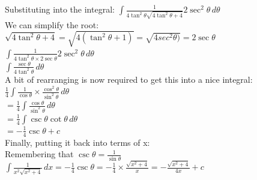 \documentclass[../main.tex]{subfiles}
\begin{document}
    Substituting into the integral:
    \(\int \frac{1}{4\tan^2{\theta}\sqrt{4\tan^2{\theta}+4}}2\sec^2{\theta}\,d\theta\)\\

    We can simplify the root:\\
    \(\sqrt{4\tan^2{\theta}+4}=\sqrt{4(\tan^2{\theta}+1)}=\sqrt{4sec^2{\theta)}}=2\sec{\theta}\)\\

    \(\int \frac{1}{4\tan^2{\theta}\times 2\sec{\theta}}2\sec^2{\theta}\,d\theta\)\\

    \(\int \frac{\sec{\theta}}{4\tan^2{\theta}}\,d\theta\)\\

    A bit of rearranging is now required to get this into a nice integral:\\
    \(\frac{1}{4}\int \frac{1}{\cos{\theta}}\times \frac{\cos^2{\theta}}{\sin^2{\theta}}\,d\theta\)\\

    \(=\frac{1}{4}\int \frac{\cos{\theta}}{\sin^2{\theta}}\,d\theta\)\\

    \(=\frac{1}{4}\int \csc{\theta} \cot{\theta}\,d\theta\)\\

    \(=-\frac{1}{4}\csc{\theta}+c\)\\

    Finally, putting it back into terms of x:\\
    Remembering that \(\csc{\theta}=\frac{1}{\sin{\theta}}\)\\

    \(\int \frac{1}{x^2\sqrt{x^2+4}}\,dx=-\frac{1}{4}\csc{\theta}=-\frac{1}{4}\times \frac{\sqrt{x^2+4}}{x}=-\frac{\sqrt{x^2+4}}{4x}+c\)\\

    
\pagebreak
\end{document}
